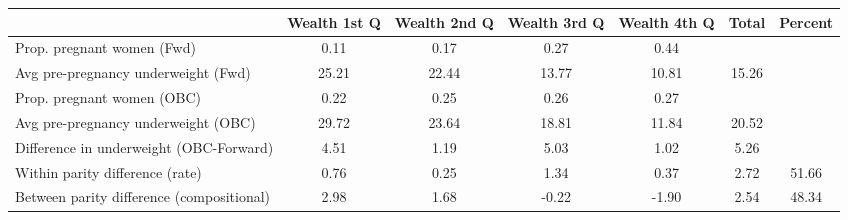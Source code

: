 \begin{tabular}{l*{6}{c}}
\toprule
            &\multicolumn{1}{c}{Wealth 1st Q}&\multicolumn{1}{c}{Wealth 2nd Q}&\multicolumn{1}{c}{Wealth 3rd Q}&\multicolumn{1}{c}{Wealth 4th Q}&\multicolumn{1}{c}{Total}&\multicolumn{1}{c}{Percent}\\
\midrule
\midrule
Prop. pregnant women (Fwd)&        0.11&        0.17&        0.27&        0.44&            &            \\
Avg pre-pregnancy underweight (Fwd)&       25.21&       22.44&       13.77&       10.81&       15.26&            \\
Prop. pregnant women (OBC)&        0.22&        0.25&        0.26&        0.27&            &            \\
Avg pre-pregnancy underweight (OBC)&       29.72&       23.64&       18.81&       11.84&       20.52&            \\
Difference in underweight (OBC-Forward)&        4.51&        1.19&        5.03&        1.02&        5.26&            \\
Within parity difference (rate)&        0.76&        0.25&        1.34&        0.37&        2.72&       51.66\\
Between parity difference (compositional)&        2.98&        1.68&       -0.22&       -1.90&        2.54&       48.34\\
\bottomrule
\end{tabular}
